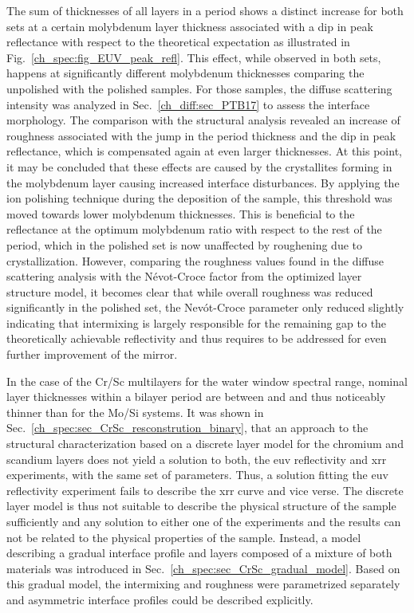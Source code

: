 The sum of thicknesses of all layers in a period shows a distinct increase for both sets at a certain molybdenum layer thickness associated with a dip in peak reflectance with respect to the theoretical expectation as illustrated in Fig.~\ref{ch_spec:fig_EUV_peak_refl}. This effect, while observed in both sets, happens at significantly different molybdenum thicknesses comparing the unpolished with the polished samples. For those samples, the diffuse scattering intensity was analyzed in Sec.~\ref{ch_diff:sec_PTB17} to assess the interface morphology. The comparison with the structural analysis revealed an increase of roughness associated with the jump in the period thickness and the dip in peak reflectance, which is compensated again at even larger thicknesses. At this point, it may be concluded that these effects are caused by the crystallites forming in the molybdenum layer causing increased interface disturbances. By applying the ion polishing technique during the deposition of the sample, this threshold was moved towards lower molybdenum thicknesses. This is beneficial to the reflectance at the optimum molybdenum ratio with respect to the rest of the period, which in the polished set is now unaffected by roughening due to crystallization. However, comparing the roughness values found in the diffuse scattering analysis with the N{\'e}vot-Croce factor from the optimized layer structure model, it becomes clear that while overall roughness was reduced significantly in the polished set, the Nev{\'o}t-Croce parameter only reduced slightly indicating that intermixing is largely responsible for the remaining gap to the theoretically achievable reflectivity and thus requires to be addressed for even further improvement of the mirror.

In the case of the Cr/Sc multilayers for the water window spectral range, nominal layer thicknesses within a bilayer period are between  and  and thus noticeably thinner than for the Mo/Si systems. It was shown in Sec.~\ref{ch_spec:sec_CrSc_resconstrution_binary}, that an approach to the structural characterization based on a discrete layer model for the chromium and scandium layers does not yield a solution to both, the \gls{euv} reflectivity and \gls{xrr} experiments, with the same set of parameters. Thus, a solution fitting the \gls{euv} reflectivity experiment fails to describe the \gls{xrr} curve and vice verse. The discrete layer model is thus not suitable to describe the physical structure of the sample sufficiently and any solution to either one of the experiments and the results can not be related to the physical properties of the sample. Instead, a model describing a gradual interface profile and layers composed of a mixture of both materials was introduced in Sec.~\ref{ch_spec:sec_CrSc_gradual_model}. Based on this gradual model, the intermixing and roughness were parametrized separately and asymmetric interface profiles could be described explicitly.

